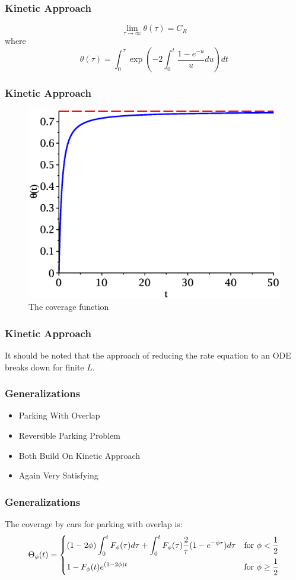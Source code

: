 \documentclass{beamer}
\begin{document}
\begin{frame}
    \frametitle{Kinetic Approach}
    \[
        \lim_{\tau \to \infty} \theta(\tau) = C_R
    \]
    where
    \[
        \theta(\tau) = \int_{0}^{\tau} \exp \left( -2 \int_{0}^{t} \frac{1 - e^{-u}}{u} du \right) dt
    \]
\end{frame}

\begin{frame}
    \frametitle{Kinetic Approach}
    \begin{figure}[h!]
    	\includegraphics[scale = 0.35]{theta_01.eps}
    	\caption{The coverage function}
    \end{figure}
\end{frame}

\begin{frame}
	\frametitle{Kinetic Approach}
	It should be noted that the approach of reducing the rate equation to an ODE breaks down 
	for finite $L$.
\end{frame}

\begin{frame}
    \frametitle{Generalizations}
    \begin{itemize}
        \item Parking With Overlap
        \item Reversible Parking Problem
        \item Both Build On Kinetic Approach
        \item Again Very Satisfying
    \end{itemize}
\end{frame}

\begin{frame}[fragile]
	\frametitle{Generalizations}
	The coverage by cars for parking with overlap is:
	\begin{eqnarray*}
		\Theta_{\phi}(t) = 
		\begin{dcases}
			(1 - 2 \phi) \int_{0}^{t} F_{\phi}(\tau) d \tau  + \int_{0}^{t} F_{\phi}(\tau) \frac{2}{\tau} (1 - e^{-\phi \tau}) d \tau			& \text{for } \phi < \frac{1}{2} \\
			1 - F_{\phi}(t) e^{(1 - 2 \phi)t}																									& \text{for } \phi \geq \frac{1}{2} 
		\end{dcases}
	\end{eqnarray*}
\end{frame}
\end{document}
